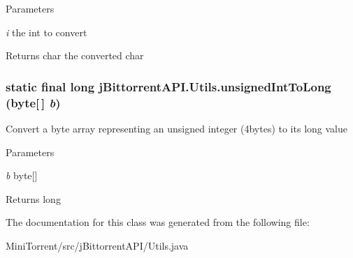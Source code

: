 \begin{DoxyParams}{Parameters}
\item[{\em i}]the int to convert \end{DoxyParams}
\begin{DoxyReturn}{Returns}
char the converted char 
\end{DoxyReturn}
\hypertarget{classj_bittorrent_a_p_i_1_1_utils_a2f60eb5883519574e6940ade17c3de31}{
\subsubsection[{unsignedIntToLong}]{\setlength{\rightskip}{0pt plus 5cm}static final long jBittorrentAPI.Utils.unsignedIntToLong (byte\mbox{[}$\,$\mbox{]} {\em b})}}
\label{classj_bittorrent_a_p_i_1_1_utils_a2f60eb5883519574e6940ade17c3de31}
Convert a byte array representing an unsigned integer (4bytes) to its long value 
\begin{DoxyParams}{Parameters}
\item[{\em b}]byte\mbox{[}\mbox{]} \end{DoxyParams}
\begin{DoxyReturn}{Returns}
long 
\end{DoxyReturn}


The documentation for this class was generated from the following file:\begin{DoxyCompactItemize}
\item 
MiniTorrent/src/jBittorrentAPI/Utils.java\end{DoxyCompactItemize}
